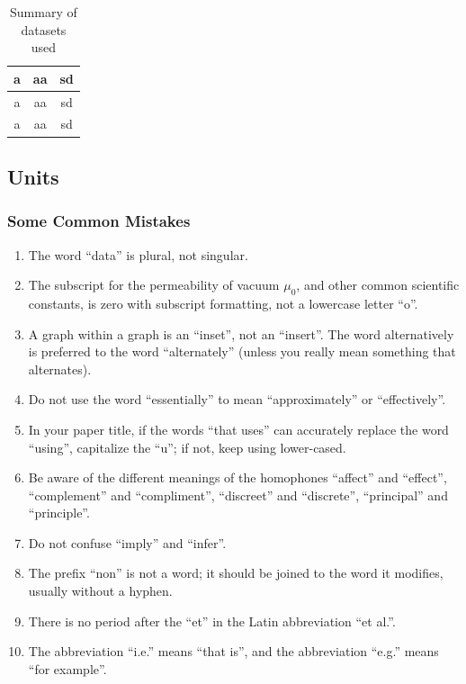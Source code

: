 \documentclass{article} %
\begin{document}
\begin{multicols}{2}
\begin{table}[H]
	\centering
	\begin{tabular}{|c|c|c|}
	
		\hline
		
		a & aa & sd \\\hline
		a & aa & sd \\\hline
		a & aa & sd \\\hline
		
	\end{tabular}
	\caption{\footnotesize{Summary of datasets used}}
	\label{tab:veris}
\end{table}

\subsection{Units}

\subsubsection{ Some Common Mistakes}

\begin{enumerate}
\item \textit{ }The word ``data'' is plural, not singular.
\item  The subscript for the permeability of vacuum ${\mu}_{0}$, and other common scientific constants, is zero with subscript formatting, not a lowercase letter ``o''.
\item  A graph within a graph is an ``inset'', not an ``insert''. The word alternatively is preferred to the word ``alternately'' (unless you really mean something that alternates).
\item  Do not use the word ``essentially'' to mean ``approximately'' or ``effectively''.
\item  In your paper title, if the words ``that uses'' can accurately replace the word ``using'', capitalize the ``u''; if not, keep using lower-cased.
\item  Be aware of the different meanings of the homophones ``affect'' and ``effect'', ``complement'' and ``compliment'', ``discreet'' and ``discrete'', ``principal'' and ``principle''.
\item  Do not confuse ``imply'' and ``infer''.
\item  The prefix ``non'' is not a word; it should be joined to the word it modifies, usually without a hyphen.
\item  There is no period after the ``et'' in the Latin abbreviation ``et al.''.
\item  The abbreviation ``i.e.'' means ``that is'', and the abbreviation ``e.g.'' means ``for example''.
\end{enumerate}



\end{multicols}
\end{document}
